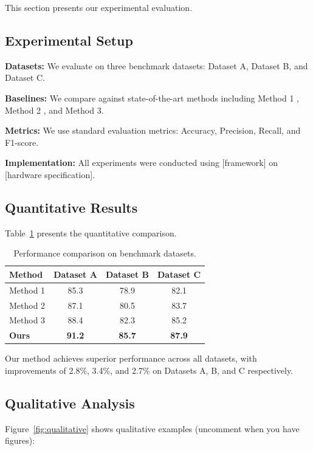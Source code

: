 \documentclass[twocolumn]{article}
\theoremstyle{definition}
\theoremstyle{remark}
\begin{document}
This section presents our experimental evaluation.

\subsection{Experimental Setup}

\textbf{Datasets:} We evaluate on three benchmark datasets: Dataset A, Dataset B, 
and Dataset C.

\textbf{Baselines:} We compare against state-of-the-art methods including 
Method 1 \cite{example2023}, Method 2 \cite{examplebook2022}, and Method 3.

\textbf{Metrics:} We use standard evaluation metrics: Accuracy, Precision, 
Recall, and F1-score.

\textbf{Implementation:} All experiments were conducted using [framework] on 
[hardware specification].

\subsection{Quantitative Results}

Table~\ref{tab:results} presents the quantitative comparison.

\begin{table}[H]
\centering
\caption{Performance comparison on benchmark datasets.}
\label{tab:results}
\begin{tabular}{lccc}
\toprule
\textbf{Method} & \textbf{Dataset A} & \textbf{Dataset B} & \textbf{Dataset C} \\
\midrule
Method 1 & 85.3 & 78.9 & 82.1 \\
Method 2 & 87.1 & 80.5 & 83.7 \\
Method 3 & 88.4 & 82.3 & 85.2 \\
\textbf{Ours} & \textbf{91.2} & \textbf{85.7} & \textbf{87.9} \\
\bottomrule
\end{tabular}
\end{table}

Our method achieves superior performance across all datasets, with improvements 
of 2.8\%, 3.4\%, and 2.7\% on Datasets A, B, and C respectively.

\subsection{Qualitative Analysis}

Figure~\ref{fig:qualitative} shows qualitative examples (uncomment when you have figures):
\end{document}
